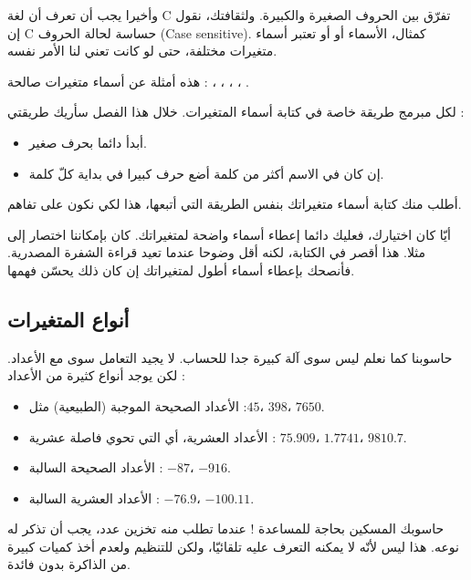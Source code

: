 وأخيرا يجب أن تعرف أن لغة
\textenglish{C}
 تفرّق بين الحروف الصغيرة والكبيرة. ولثقافتك، نقول إن
\textenglish{C}
 حساسة لحالة الحروف
(\textenglish{Case sensitive}).
كمثال، الأسماء
 أو
 أو
تعتبر أسماء متغيرات مختلفة، حتى لو كانت تعني لنا الأمر نفسه.

هذه أمثلة عن أسماء متغيرات صالحة :
،
،
،
،
.

لكل مبرمج طريقة خاصة في كتابة أسماء المتغيرات. خلال هذا الفصل سأريك طريقتي :

\begin{itemize}
  \item أبدأ دائما بحرف صغير.
  \item إن كان في الاسم أكثر من كلمة أضع حرف كبيرا في بداية كلّ كلمة.
\end{itemize}

أطلب منك كتابة أسماء متغيراتك بنفس الطريقة التي أتبعها، هذا لكي نكون على تفاهم.

\begin{critical}
  أيّا كان اختيارك، فعليك دائما إعطاء أسماء واضحة لمتغيراتك. كان بإمكاننا اختصار
إلى
مثلا. هذا أقصر في الكتابة، لكنه أقل وضوحا عندما تعيد قراءة الشفرة المصدرية. فأنصحك بإعطاء أسماء أطول لمتغيراتك إن كان ذلك يحسّن فهمها.
\end{critical}

\subsection{أنواع المتغيرات}

حاسوبنا كما نعلم ليس سوى آلة كبيرة جدا للحساب. لا يجيد التعامل سوى مع الأعداد. لكن يوجد أنواع كثيرة من الأعداد :

\begin{itemize}
  \item الأعداد الصحيحة الموجبة (الطبيعية) مثل :$ 45 $، $ 398 $، $ 7650 $.
  \item الأعداد العشرية، أي التي تحوي فاصلة عشرية : $ 75.909 $، $ 1.7741 $، $ 9810.7 $.
  \item الأعداد الصحيحة السالبة : $ -87 $، $ -916 $.
  \item الأعداد العشرية السالبة : $ -76.9 $، $ -100.11 $.
\end{itemize}

حاسوبك المسكين بحاجة للمساعدة ! عندما تطلب منه تخزين عدد، يجب أن تذكر له نوعه. هذا ليس لأنّه لا يمكنه التعرف عليه تلقائيّا، ولكن للتنظيم ولعدم أخذ كميات كبيرة من الذاكرة بدون فائدة.


